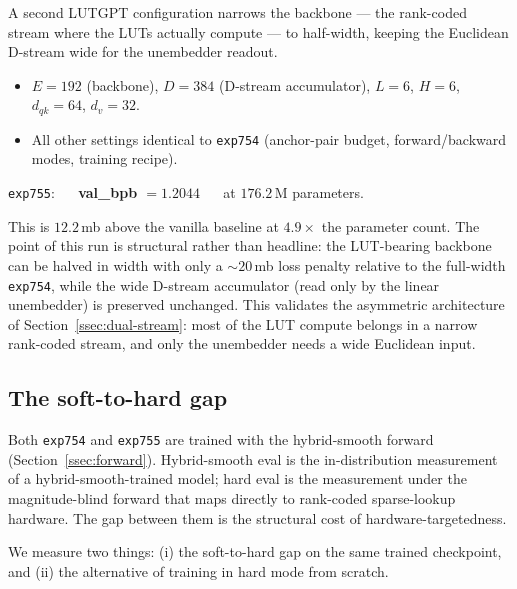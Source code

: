 \documentclass[11pt]{article}
\newcommand{\dqk}{d_{qk}}
\newcommand{\dv}{d_v}
\begin{document}
A second LUTGPT configuration narrows the backbone --- the rank-coded stream where the LUTs actually compute --- to half-width, keeping the Euclidean D-stream wide for the unembedder readout.

\begin{itemize}[leftmargin=*,topsep=2pt,itemsep=1pt]
\item $E = 192$ (backbone), $D = 384$ (D-stream accumulator), $L = 6$, $H = 6$, $\dqk = 64$, $\dv = 32$.
\item All other settings identical to \texttt{exp754} (anchor-pair budget, forward/backward modes, training recipe).
\end{itemize}

\begin{center}
\texttt{exp755}: $\quad$ \textbf{val\_bpb $= 1.2044$} $\quad$ at $176.2$\,M parameters.
\end{center}

This is $12.2$\,mb above the vanilla baseline at $4.9\times$ the parameter count. The point of this run is structural rather than headline: the LUT-bearing backbone can be halved in width with only a $\sim 20$\,mb loss penalty relative to the full-width \texttt{exp754}, while the wide D-stream accumulator (read only by the linear unembedder) is preserved unchanged. This validates the asymmetric architecture of Section~\ref{ssec:dual-stream}: most of the LUT compute belongs in a narrow rank-coded stream, and only the unembedder needs a wide Euclidean input.

\subsection{The soft-to-hard gap}
\label{ssec:exp-soft-hard}

Both \texttt{exp754} and \texttt{exp755} are trained with the hybrid-smooth forward (Section~\ref{ssec:forward}). Hybrid-smooth eval is the in-distribution measurement of a hybrid-smooth-trained model; hard eval is the measurement under the magnitude-blind forward that maps directly to rank-coded sparse-lookup hardware. The gap between them is the structural cost of hardware-targetedness.

We measure two things: (i) the soft-to-hard gap on the same trained checkpoint, and (ii) the alternative of training in hard mode from scratch.
\end{document}

